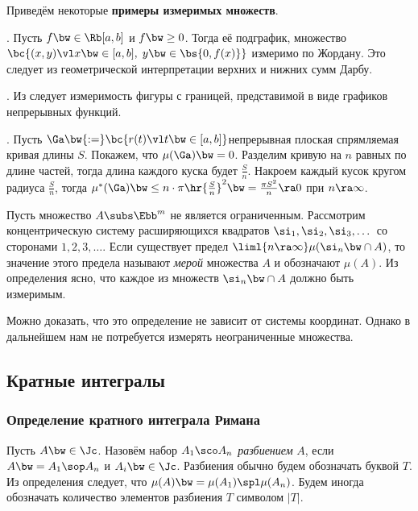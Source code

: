 \documentclass[a4paper]{article}
\begin{document}
Приведём некоторые \textbf{примеры измеримых множеств}.

. Пусть $f \bw\in \Rb[a,b]$ и $f \bw\ge 0$. Тогда её подграфик,  множество $\bc{(x,y) \vl x \bw\in
[a,b], \; y\bw\in \bs{0, f(x)}}$ измеримо по Жордану. Это следует из геометрической интерпретации
верхних и нижних сумм Дарбу.

. Из  следует измеримость фигуры с границей, представимой в виде графиков непрерывных функций.

. Пусть $\Ga \bw{:=}\bc{r(t) \vl t \bw\in [a,b]}$\т непрерывная плоская спрямляемая кривая
длины $S$. Покажем, что $\mu(\Ga) \bw= 0$. Разделим кривую на $n$ равных по длине частей, тогда длина
каждого куска будет $\frac{S}{n}$. Накроем каждый кусок кругом радиуса $\frac{S}{n}$, тогда
$\mu^*(\Ga) \bw\le n \cdot \pi\hr{\frac{S}{n}}^2 \bw= \frac{\pi S^2}{n} \ra 0$ при $n \ra \infty$.

\begin{df}
Пусть множество $A \subs \Ebb^m$ не является ограниченным. Рассмотрим концентрическую систему расширяющихся
квадратов $\si_1,\si_2,\si_3,\dots$ со сторонами $1, 2, 3, \dots$. Если существует предел $\liml{n
\ra \infty} \mu(\si_n \bw\cap A)$, то значение этого предела называют \emph{мерой} множества $A$ и
обозначают $\mu(A)$. Из определения ясно, что каждое из множеств $\si_n \bw\cap A$ должно быть
измеримым.
\end{df}

\begin{note}
Можно доказать, что это определение не зависит от системы координат. Однако в дальнейшем нам
не потребуется измерять неограниченные множества.
\end{note}

\subsection{Кратные интегралы}

\subsubsection{Определение кратного интеграла Римана}

\begin{df}
Пусть $A \bw\in \Jc$. Назовём набор $A_1\sco A_n$ \emph{разбиением} $A$, если $A \bw= A_1 \sop A_n$ и
$A_i \bw\in \Jc$. Разбиения обычно будем обозначать буквой $T$. Из определения следует, что $\mu(A) \bw=
\mu(A_1)\spl \mu(A_n)$. Будем иногда обозначать количество элементов разбиения $T$ символом $|T|$.
\end{df}
\end{document}
